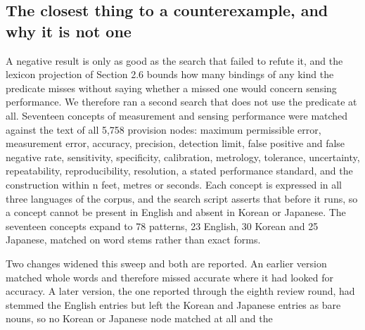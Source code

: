 \subsection{The closest thing to a counterexample, and why it is not one}\label{sec:3.6}

A negative result is only as good as the search that failed to refute it, and the lexicon projection of Section 2.6 bounds how many bindings of any kind the predicate misses without saying whether a missed one would concern sensing performance. We therefore ran a second search that does not use the predicate at all. Seventeen concepts of measurement and sensing performance were matched against the text of all 5,758 provision nodes: maximum permissible error, measurement error, accuracy, precision, detection limit, false positive and false negative rate, sensitivity, specificity, calibration, metrology, tolerance, uncertainty, repeatability, reproducibility, resolution, a stated performance standard, and the construction within n feet, metres or seconds. Each concept is expressed in all three languages of the corpus, and the search script asserts that before it runs, so a concept cannot be present in English and absent in Korean or Japanese. The seventeen concepts expand to 78 patterns, 23 English, 30 Korean and 25 Japanese, matched on word stems rather than exact forms.

Two changes widened this sweep and both are reported. An earlier version matched whole words and therefore missed accurate where it had looked for accuracy. A later version, the one reported through the eighth review round, had stemmed the English entries but left the Korean and Japanese entries as bare nouns, so no Korean or Japanese node matched at all and the

